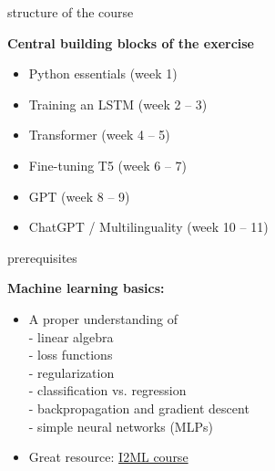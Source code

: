 \begin{vbframe}{structure of the course}

\vfill

\textbf{Central building blocks of the exercise}

	\begin{itemize}
		\item Python essentials (week 1)
		\item Training an LSTM (week 2 -- 3)
		\item Transformer (week 4 -- 5)
		\item Fine-tuning T5 (week 6 -- 7)
		\item GPT (week 8 -- 9)
		\item ChatGPT / Multilinguality (week 10 -- 11)
	\end{itemize}

\vfill

\end{vbframe}


\begin{vbframe}{prerequisites}
	
\vfill
	
\textbf{Machine learning basics:}

		\begin{itemize}
				\item A proper understanding of\\
				- linear algebra\\
				- loss functions\\
				- regularization\\
				- classification vs. regression\\
				- backpropagation and gradient descent\\
				- simple neural networks (MLPs)
				\item Great resource: \href{https://slds-lmu.github.io/i2ml/}{I2ML course}
		\end{itemize}

\vfill

\end{vbframe}


